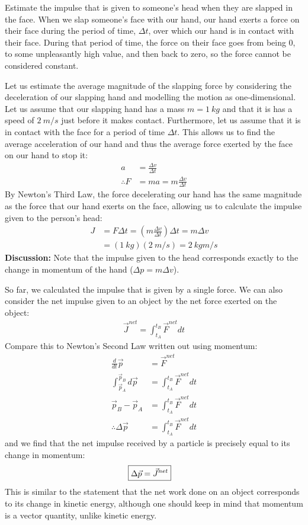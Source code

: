 \begin{example}{Estimate the impulse that is given to someone's head when they are slapped in the face.}
When we slap someone's face with our hand, our hand exerts a force on their face during the period of time, $\Delta t$, over which our hand is in contact with their face. During that period of time, the force on their face goes from being 0, to some unpleasantly high value, and then back to zero, so the force cannot be considered constant. 

Let us estimate the average magnitude of the slapping force by considering the deceleration of our slapping hand and modelling the motion as one-dimensional. Let us assume that our slapping hand has a mass $m=\SI{1}{kg}$ and that it is has a speed of $\SI{2}{m/s}$ just before it makes contact. Furthermore, let us assume that it is in contact with the face for a period of time $\Delta t$. This allows us to find the average acceleration of our hand and thus the average force exerted by the face on our hand to stop it:
\begin{align*}
a &= \frac{\Delta v}{\Delta t}\\
\therefore F &= ma = m  \frac{\Delta v}{\Delta t}
\end{align*}
By Newton's Third Law, the force decelerating our hand has the same magnitude as the force that our hand exerts on the face, allowing us to calculate the impulse given to the person's head:
\begin{align*}
J &= F\Delta t =  \left(m  \frac{\Delta v}{\Delta t}\right) \Delta t = m\Delta v\\
&=(\SI{1}{kg})(\SI{2}{m/s})=\SI{2}{kgm/s}
\end{align*}
\textbf{Discussion:} Note that the impulse given to the head corresponds exactly to the change in momentum of the hand ($\Delta p=m\Delta v$).
\end{example}

So far, we calculated the impulse that is given by a single force. We can also consider the net impulse given to an object by the net force exerted on the object:
\begin{align*}
\vec J^{net} = \int_{t_A}^{t_B}\vec F^{net} dt
\end{align*}
Compare this to Newton's Second Law written out using momentum:
\begin{align*}
\frac{d}{dt}\vec p &= \vec F^{net}\\
\int_{\vec p_A}^{\vec p_B} d\vec p &=  \int_{t_A}^{t_B}\vec F^{net} dt\\
\vec p_B - \vec p_A &=  \int_{t_A}^{t_B}\vec F^{net}dt\\
\therefore \Delta \vec p &= \int_{t_A}^{t_B}\vec F^{net}	 dt
\end{align*}
and we find that the net impulse received by a particle is precisely equal to its change in momentum:
\begin{align}
\Aboxed{\Delta \vec p = \vec J^{net}}
\end{align}
This is similar to the statement that the net work done on an object corresponds to its change in kinetic energy, although one should keep in mind that momentum is a vector quantity, unlike kinetic energy.

